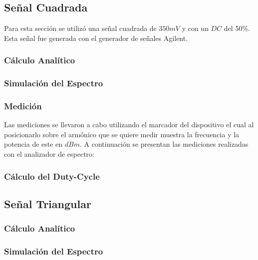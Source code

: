 \subsection{Señal Cuadrada}
Para esta sección se utilizó una señal cuadrada de $350mV$ y con un $DC$ del 50\%. Esta señal fue generada con el generador de señales Agilent.
\subsubsection{Cálculo Analítico}

\subsubsection{Simulación del Espectro}

\subsubsection{Medición}
Las mediciones se llevaron a cabo utilizando el marcador del dispositivo el cual al posicionarlo sobre el armónico que se quiere medir muestra la frecuencia y la potencia de este en $dBm$. A continuación se presentan las mediciones realizadas con el analizador de espectro:

\begin{table}[]
\end{table}

\subsubsection{Cálculo del Duty-Cycle}	

\subsection{Señal Triangular}

\subsubsection{Cálculo Analítico}

\subsubsection{Simulación del Espectro}


